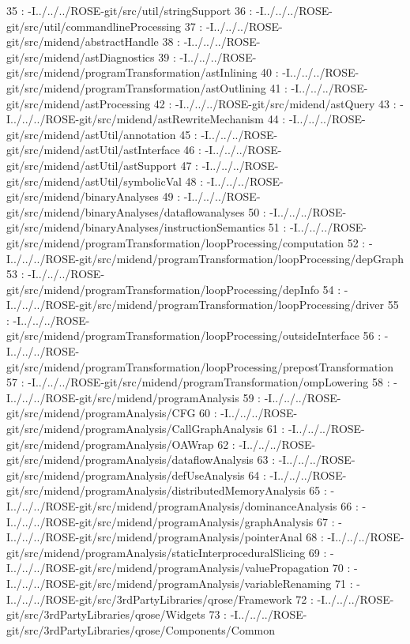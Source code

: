   35 : -I../../../ROSE-git/src/util/stringSupport
  36 : -I../../../ROSE-git/src/util/commandlineProcessing
  37 : -I../../../ROSE-git/src/midend/abstractHandle
  38 : -I../../../ROSE-git/src/midend/astDiagnostics
  39 : -I../../../ROSE-git/src/midend/programTransformation/astInlining
  40 : -I../../../ROSE-git/src/midend/programTransformation/astOutlining
  41 : -I../../../ROSE-git/src/midend/astProcessing
  42 : -I../../../ROSE-git/src/midend/astQuery
  43 : -I../../../ROSE-git/src/midend/astRewriteMechanism
  44 : -I../../../ROSE-git/src/midend/astUtil/annotation
  45 : -I../../../ROSE-git/src/midend/astUtil/astInterface
  46 : -I../../../ROSE-git/src/midend/astUtil/astSupport
  47 : -I../../../ROSE-git/src/midend/astUtil/symbolicVal
  48 : -I../../../ROSE-git/src/midend/binaryAnalyses
  49 : -I../../../ROSE-git/src/midend/binaryAnalyses/dataflowanalyses
  50 : -I../../../ROSE-git/src/midend/binaryAnalyses/instructionSemantics
  51 : -I../../../ROSE-git/src/midend/programTransformation/loopProcessing/computation
  52 : -I../../../ROSE-git/src/midend/programTransformation/loopProcessing/depGraph
  53 : -I../../../ROSE-git/src/midend/programTransformation/loopProcessing/depInfo
  54 : -I../../../ROSE-git/src/midend/programTransformation/loopProcessing/driver
  55 : -I../../../ROSE-git/src/midend/programTransformation/loopProcessing/outsideInterface
  56 : -I../../../ROSE-git/src/midend/programTransformation/loopProcessing/prepostTransformation
  57 : -I../../../ROSE-git/src/midend/programTransformation/ompLowering
  58 : -I../../../ROSE-git/src/midend/programAnalysis
  59 : -I../../../ROSE-git/src/midend/programAnalysis/CFG
  60 : -I../../../ROSE-git/src/midend/programAnalysis/CallGraphAnalysis
  61 : -I../../../ROSE-git/src/midend/programAnalysis/OAWrap
  62 : -I../../../ROSE-git/src/midend/programAnalysis/dataflowAnalysis
  63 : -I../../../ROSE-git/src/midend/programAnalysis/defUseAnalysis
  64 : -I../../../ROSE-git/src/midend/programAnalysis/distributedMemoryAnalysis
  65 : -I../../../ROSE-git/src/midend/programAnalysis/dominanceAnalysis
  66 : -I../../../ROSE-git/src/midend/programAnalysis/graphAnalysis
  67 : -I../../../ROSE-git/src/midend/programAnalysis/pointerAnal
  68 : -I../../../ROSE-git/src/midend/programAnalysis/staticInterproceduralSlicing
  69 : -I../../../ROSE-git/src/midend/programAnalysis/valuePropagation
  70 : -I../../../ROSE-git/src/midend/programAnalysis/variableRenaming
  71 : -I../../../ROSE-git/src/3rdPartyLibraries/qrose/Framework
  72 : -I../../../ROSE-git/src/3rdPartyLibraries/qrose/Widgets
  73 : -I../../../ROSE-git/src/3rdPartyLibraries/qrose/Components/Common
